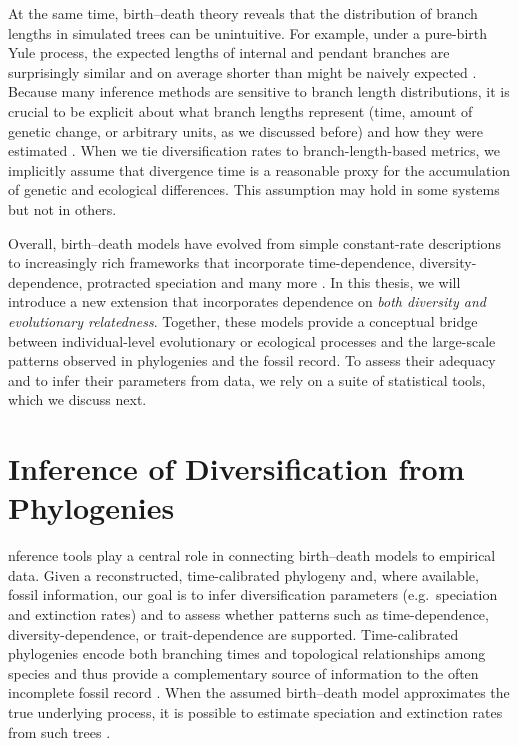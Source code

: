 At the same time, birth--death theory reveals that the distribution of branch lengths in simulated trees can be unintuitive. For example, under a pure-birth Yule process, the expected lengths of internal and pendant branches are surprisingly similar and on average shorter than might be naively expected \citep{mooers_branch_2012}. Because many inference methods are sensitive to branch length distributions, it is crucial to be explicit about what branch lengths represent (time, amount of genetic change, or arbitrary units, as we discussed before) and how they were estimated \citep{nee_birth-death_2006,etienne_diversity-dependence_2012}. When we tie diversification rates to branch-length-based metrics, we implicitly assume that divergence time is a reasonable proxy for the accumulation of genetic and ecological differences. This assumption may hold in some systems but not in others. 

Overall, birth--death models have evolved from simple constant-rate descriptions to increasingly rich frameworks that incorporate time-dependence, diversity-dependence, protracted speciation and many more \citep{maddison_estimating_2007,fitzjohn_diversitree_2012,valente_equilibrium_2015,caetano_hidden_2018, herrera-alsina_detecting_2019}. In this thesis, we will introduce a new extension that incorporates dependence on \emph{both diversity and evolutionary relatedness}. Together, these models provide a conceptual bridge between individual-level evolutionary or ecological processes and the large-scale patterns observed in phylogenies and the fossil record. To assess their adequacy and to infer their parameters from data, we rely on a suite of statistical tools, which we discuss next.

\clearpage
\section{Inference of Diversification from Phylogenies}
nference tools play a central role in connecting birth--death models to empirical data. Given a reconstructed, time-calibrated phylogeny and, where available, fossil information, our goal is to infer diversification parameters (e.g.\ speciation and extinction rates) and to assess whether patterns such as time-dependence, diversity-dependence, or trait-dependence are supported. Time-calibrated phylogenies encode both branching times and topological relationships among species and thus provide a complementary source of information to the often incomplete fossil record \citep{kidwell_quality_1996}. When the assumed birth--death model approximates the true underlying process, it is possible to estimate speciation and extinction rates from such trees \citep{nee_reconstructed_1994,nee_inferring_2001,morlon_phylogenetic_2014}. 

